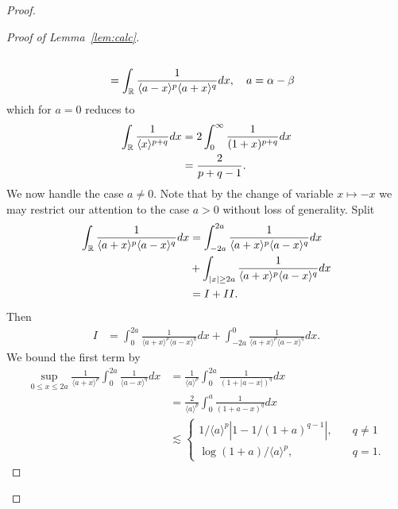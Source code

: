\begin{proof}
\begin{proof}[Proof of Lemma~\ref{lem:calc}]
\begin{equation}
\begin{split}
\\
& = \int_{\mathbb{R}} \frac{1}{\langle a - x \rangle ^{p} \langle a + x \rangle
^{q}} d x, \quad a = \alpha - \beta
\end{split}
\end{equation}
%
which for $a =0$ reduces to 
%
%
\begin{equation*}
\begin{split}
\int_{\mathbb{R}} \frac{1}{\langle x \rangle ^{p+q}} d x 
& = 2 \int_{0}^{\infty} \frac{1}{(1 + x)^{p+q}} d x
\\
& = \frac{2}{p+q -1}.
\end{split}
\end{equation*}
%
%
We now handle the case $a \neq 0$. Note that by the change of variable $x \mapsto
-x$ we may restrict our attention to the case  $a > 0$ without loss of
generality. Split
%
%
\begin{equation*}
\begin{split}
\int_{\mathbb{R}} \frac{1}{\langle a + x \rangle ^{p} \langle a - x \rangle
^{q}} d x
& = \int_{-2a}^{2a}
\frac{1}{\langle a + x \rangle ^{p} \langle a - x \rangle
^{q}} d x
\\
& + \int_{| x | \ge 2a} 
\frac{1}{\langle a + x \rangle ^{p} \langle a - x \rangle
^{q}} d x
\\
& = I + II.
\end{split}
\end{equation*}
%
%
Then
\begin{equation*}
\begin{split}
I 
& = \int_{0}^{2a}
\frac{1}{\langle a + x \rangle ^{p} \langle a - x \rangle
^{q}} d x + \int_{-2a}^{0}
\frac{1}{\langle a + x \rangle ^{p} \langle a - x \rangle
^{q}} d x.
\end{split}
\end{equation*}
We bound the first term by
\begin{equation*}
\begin{split}
\sup_{0 \le x \le 2a} \frac{1}{\langle a + x \rangle
^{p}} \int_{0}^{2a} \frac{1}{\langle a - x \rangle ^{q}} d x
& = \frac{1}{\langle a \rangle ^{p}} \int_{0}^{2a} \frac{1}{(1 + | a -
x
|)^{q}} d x  
\\
& = \frac{2}{\langle a \rangle ^{p}} \int_{0}^{a} \frac{1}{(1 + a -
x)^{q}} d x
\\
& \lesssim
\begin{cases}
1/{\langle a \rangle ^{p}} \left| 1 - 1/{(1 +
a)^{q -1}} \right|, \quad & q \neq 1
\\
\log(1+a)/{\langle a \rangle^{p} }, \quad & q =1.
\end{cases}

\end{split}
\end{equation*}
\end{proof}
\end{proof}
